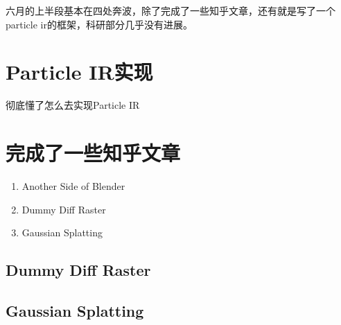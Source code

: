 六月的上半段基本在四处奔波，除了完成了一些知乎文章，还有就是写了一个particle ir的框架，科研部分几乎没有进展。

\section{Particle IR实现}

彻底懂了怎么去实现Particle IR

\section{完成了一些知乎文章}

\begin{enumerate}
    \item Another Side of Blender
    \item Dummy Diff Raster
    \item Gaussian Splatting
\end{enumerate}

\subsection{Dummy Diff Raster}


\subsection{Gaussian Splatting}
